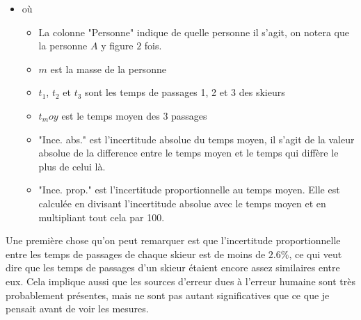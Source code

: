 \documentclass{article}
\begin{document}
\begin{center}
\end{center}
\begin{itemize}
    \item où
    \begin{itemize}
        \item La colonne "Personne" indique de quelle personne il s'agit, on notera que la personne $A$ y figure $2$ fois.
        \item $m$ est la masse de la personne
        \item $t_1$, $t_2$ et $t_3$ sont les temps de passages 1, 2 et 3 des skieurs
        \item $t_moy$ est le temps moyen des $3$ passages
        \item "Ince. abs." est l'incertitude absolue du temps moyen, il s'agit de la valeur absolue de la difference entre le temps moyen et le temps qui diffère le plus de celui là.
        \item "Ince. prop." est l'incertitude proportionnelle au temps moyen. Elle est calculée en divisant l'incertitude absolue avec le temps moyen et en multipliant tout cela par 100.
    \end{itemize}
\end{itemize}

Une première chose qu'on peut remarquer est que l'incertitude proportionnelle entre les temps de passages de chaque skieur est de moins de $2.6\%$, ce qui veut dire que les temps de passages d'un skieur étaient encore assez similaires entre eux. Cela implique aussi que les sources d'erreur dues à l'erreur humaine sont très probablement présentes, mais ne sont pas autant significatives que ce que je pensait avant de voir les mesures. 
\end{document}
